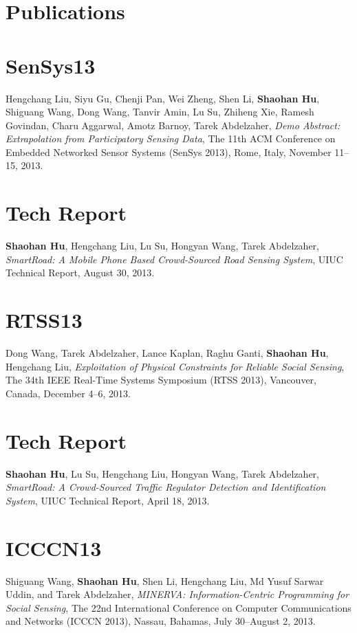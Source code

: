 \section{\sc Publications}

\section{\sc SenSys13}
Hengchang Liu, Siyu Gu, Chenji Pan, Wei Zheng, Shen Li,
\textbf{Shaohan Hu}, Shiguang Wang, Dong Wang, Tanvir Amin, Lu Su,
Zhiheng Xie, Ramesh Govindan, Charu Aggarwal, Amotz Barnoy, Tarek
Abdelzaher, \emph{Demo Abstract: Extrapolation from Participatory
  Sensing Data}, \textsf{The 11th ACM Conference on Embedded Networked
  Sensor Systems (SenSys 2013)}, Rome, Italy, November 11--15, 2013.

\section{\sc Tech Report}
\textbf{Shaohan Hu}, Hengchang Liu, Lu Su, Hongyan Wang, Tarek
Abdelzaher, \emph{SmartRoad: A Mobile Phone Based Crowd-Sourced Road
  Sensing System}, \textsf{UIUC Technical Report}, August 30, 2013.

\section{\sc RTSS13}
Dong Wang, Tarek Abdelzaher, Lance Kaplan, Raghu Ganti,
\textbf{Shaohan Hu}, Hengchang Liu, \emph{Exploitation of Physical
  Constraints for Reliable Social Sensing}, \textsf{The 34th IEEE
  Real-Time Systems Symposium (RTSS 2013)}, Vancouver, Canada,
December 4--6, 2013.

\section{\sc Tech Report}
\textbf{Shaohan Hu}, Lu Su, Hengchang Liu, Hongyan Wang, Tarek
Abdelzaher, \emph{SmartRoad: A Crowd-Sourced Traffic Regulator
  Detection and Identification System}, \textsf{UIUC Technical
  Report}, April 18, 2013.

\section{\sc ICCCN13}
Shiguang Wang, \textbf{Shaohan Hu}, Shen Li, Hengchang Liu, Md Yusuf
Sarwar Uddin, and Tarek Abdelzaher, \emph{MINERVA: Information-Centric
  Programming for Social Sensing}, \textsf{The 22nd International
  Conference on Computer Communications and Networks (ICCCN 2013)},
Nassau, Bahamas, July 30--August 2, 2013.

